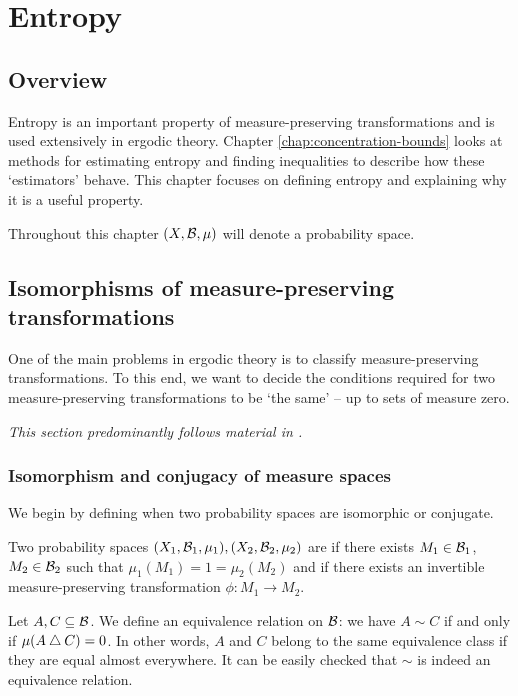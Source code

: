 \chapter{Entropy}
\section{Overview}
Entropy is an important property of measure-preserving transformations and is used extensively in ergodic theory. Chapter \ref{chap:concentration-bounds} looks at methods for estimating entropy and finding inequalities to describe how these `estimators' behave. This chapter focuses on defining entropy and explaining why it is a useful property.

Throughout this chapter $(X, \mathcal{B}, \mu)$ will denote a probability space.

\section{Isomorphisms of measure-preserving transformations}\label{sec:isos-of-mpts}
One of the main problems in ergodic theory is to classify measure-preserving transformations. To this end, we want to decide the conditions required for two measure-preserving transformations to be `the same' -- up to sets of measure zero.

\emph{This section predominantly follows material in \cite[Chapter 2]{walters:intro-to-ergodic-theory}.}

\subsection{Isomorphism and conjugacy of measure spaces}

We begin by defining when two probability spaces are isomorphic or conjugate.

\begin{definition}
	Two probability spaces $(X_1, \mathcal{B}_1, \mu_1), (X_2, \mathcal{B}_2, \mu_2)$ are  if there exists $M_1 \in \mathcal{B}_1$, $M_2 \in \mathcal{B}_2$ such that $\mu_1(M_1) = 1 = \mu_2(M_2)$ and if there exists an invertible measure-preserving transformation $\phi: M_1 \to M_2$.
\end{definition}

Let $A, C \subseteq \mathcal{B}$. We define an equivalence relation on $\mathcal{B}$: we have $A \sim C$ if and only if $\mu(A \bigtriangleup C) = 0$. In other words, $A$ and $C$ belong to the same equivalence class if they are equal almost everywhere. It can be easily checked that $\sim$ is indeed an equivalence relation.

